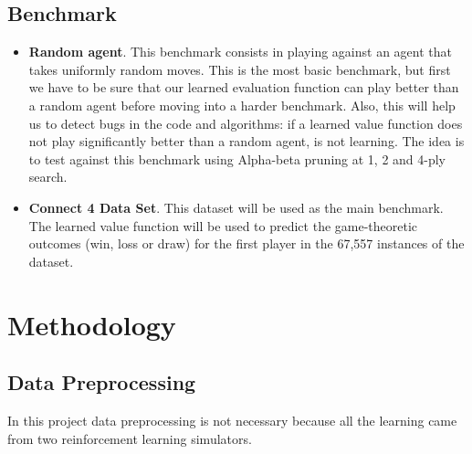 \documentclass{article}
\begin{document}
\subsection{Benchmark}
\label{sec:benchmark}

\begin{itemize}

    \item \textbf{Random agent}. This benchmark consists in playing against an agent that takes
        uniformly random moves. This is the most basic benchmark, but first we have to be sure that
        our learned evaluation function can play better than a random agent before moving into a
        harder benchmark. Also, this will help us to detect bugs in the code and algorithms: if a
        learned value function does not play significantly better than a random agent, is not
        learning. The idea is to test against this benchmark using Alpha-beta pruning at 1, 2 and
        4-ply search.

    \item \textbf{Connect 4 Data Set}. This dataset will be used as the main benchmark. The learned
        value function will be used to predict the game-theoretic outcomes (win, loss or draw) for
        the first player in the 67,557 instances of the dataset.

\end{itemize}

\pagebreak[4]

\section{Methodology}

\subsection{Data Preprocessing}

In this project data preprocessing is not necessary because all the learning came from two
reinforcement learning simulators.

\end{document}
